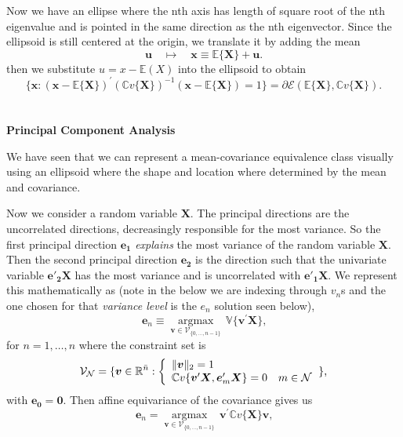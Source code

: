 \documentclass{article}
\theoremstyle{definition}
\theoremstyle{remark}
\begin{document}
\par Now we have an ellipse where 
the nth axis has length of square root of the nth eigenvalue and is pointed 
in the same direction as the nth eigenvector. Since the ellipsoid
is still centered at the origin, we translate it by adding the mean
\begin{equation}
    \boldsymbol{u}\quad\mapsto\quad\boldsymbol{x}\equiv\mathbb{E}\{\boldsymbol{X}\}+\boldsymbol{u}\text{.}
    \end{equation}
then we substitute $u = x - \mathbb{E}(X)$ into the ellipsoid to obtain 
\begin{equation}
    \{\boldsymbol{x}:(\boldsymbol{x}-\mathbb{E}\{\boldsymbol{X}\})^{\prime}\left( \mathbb{C}v\{\boldsymbol{X}\}\right) ^{-1}(\boldsymbol{x}-\mathbb{E}\{\boldsymbol{X}\})=1\}=\partial\mathcal{E}(\mathbb{E}\{\boldsymbol{X}\},\mathbb{C}v\{\boldsymbol{X}\})\text{.}
    \end{equation}\\
\\ \textbf{Principal Component Analysis}\\
\par We have seen that we can represent
a mean-covariance equivalence class visually using an ellipsoid 
where the shape and location where determined by the mean and covariance.
\par Now we consider a random variable $\mathbf{X}$. The principal
directions are the uncorrelated directions, decreasingly responsible for the most variance.
So the first principal direction $\mathbf{e_1}$ \textit{explains} the most variance of the random variable $\mathbf{X}$. Then
the second principal direction $\mathbf{e_2}$ is the 
direction such that the univariate variable $\mathbf{e'_2X}$ has the most variance
and is uncorrelated with $\mathbf{e'_1X}$.
We represent this mathematically as (note in the below we are indexing through $v_n$s and the one chosen for that \textit{variance level} is the $e_n$ solution seen below), 
\begin{equation}
    \boldsymbol{e}_{n}\equiv\operatorname*{argmax}\limits_{\boldsymbol{v}\in\mathcal{V}_{\{0,...,n-1\}}}\,\mathbb{V}\{\boldsymbol{v}^{\prime}\boldsymbol{X}\}\text{,}
    \end{equation}
for $n = 1,\dots, n$ where the constraint set is 
\begin{equation}
    \mathcal{V}_{\mathcal{N}}=\{\boldsymbol{v}\in\mathbb{R}^{\bar{n}}:\left\{ \begin{array}
    [c]{ll}\Vert\boldsymbol{v}\Vert_{2}=1 & \\
    \mathbb{C}v\{\boldsymbol{v}^{\prime}\boldsymbol{X},\boldsymbol{e}_{m}^{\prime}\boldsymbol{X}\}=0 & m\in\mathcal{N}
    \end{array} \right. \}\text{,}
    \end{equation}
with $\mathbf{e_0} = \mathbf{0}$. Then
affine equivariance of the covariance gives us
\begin{equation}
    \boldsymbol{e}_{n}=\operatorname*{argmax}\limits_{\boldsymbol{v}\in \mathcal{V}_{\{0,...,n-1\}}}\,\boldsymbol{v}^{\prime}\mathbb{C}v\{\boldsymbol{X}\}\boldsymbol{v}\text{,}
    \end{equation}
\end{document}
